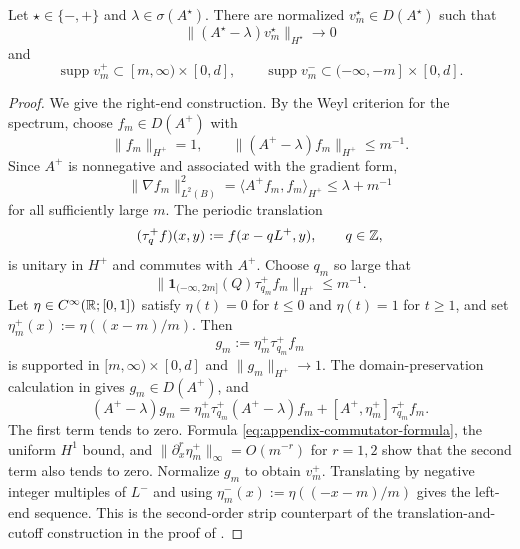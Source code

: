\begin{lemma}
\label{lem:appendix-one-sided-Weyl}
Let $\star\in\{-,+\}$ and
$\lambda\in\sigma(A^\star)$.  There are normalized
$v_m^\star\in D(A^\star)$ such that
\[
  \|(A^\star-\lambda)v_m^\star\|_{H^\star}\longrightarrow0
\]
and
\[
  \operatorname{supp}v_m^+\subset[m,\infty)\times[0,d],
  \qquad
  \operatorname{supp}v_m^-\subset(-\infty,-m]\times[0,d].
\]
\end{lemma}
\begin{proof}
We give the right-end construction.  By the Weyl criterion for the spectrum,
choose $f_m\in D(A^+)$ with
\[
  \|f_m\|_{H^+}=1,\qquad
  \|(A^+-\lambda)f_m\|_{H^+}\leq m^{-1}.
\]
Since $A^+$ is nonnegative and associated with the gradient form,
\[
  \|\nabla f_m\|_{L^2(B)}^2
  =\langle A^+f_m,f_m\rangle_{H^+}
  \leq\lambda+m^{-1}
\]
for all sufficiently large $m$.  The periodic translation
\[
  (\tau_q^+f)(x,y):=f(x-qL^+,y),\qquad q\in\mathbb{Z},
\]
is unitary in $H^+$ and commutes with $A^+$.  Choose $q_m$ so large that
\[
  \bigl\|\mathbf 1_{(-\infty,2m]}(Q)\tau_{q_m}^+f_m
  \bigr\|_{H^+}\leq m^{-1}.
\]
Let $\eta\in C^\infty(\mathbb{R};[0,1])$ satisfy
$\eta(t)=0$ for $t\leq0$ and $\eta(t)=1$ for $t\geq1$, and set
$\eta_m^+(x):=\eta((x-m)/m)$.  Then
\[
  g_m:=\eta_m^+\tau_{q_m}^+f_m
\]
is supported in $[m,\infty)\times[0,d]$ and
$\|g_m\|_{H^+}\to1$.  The domain-preservation calculation in
 gives $g_m\in D(A^+)$, and
\[
  (A^+-\lambda)g_m
  =\eta_m^+\tau_{q_m}^+(A^+-\lambda)f_m
   +[A^+,\eta_m^+]\tau_{q_m}^+f_m.
\]
The first term tends to zero.  Formula
\eqref{eq:appendix-commutator-formula}, the uniform $H^1$ bound, and
$\|\partial_x^r\eta_m^+\|_\infty=O(m^{-r})$ for $r=1,2$ show that the second
term also tends to zero.  Normalize $g_m$ to obtain $v_m^+$.  Translating by
negative integer multiples of $L^-$ and using
$\eta_m^-(x):=\eta((-x-m)/m)$ gives the left-end sequence.  This is the
second-order strip counterpart of the translation-and-cutoff construction in
the proof of
\cite[Proposition~3.10]{DeNittisEtAl2021}.
\end{proof}

